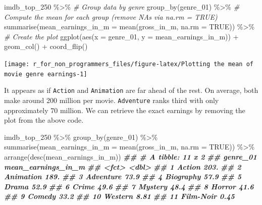\documentclass[
]{book}
\newenvironment{Shaded}{\begin{snugshade}}{\end{snugshade}}
\newcommand{\AttributeTok}[1]{\textcolor[rgb]{0.77,0.63,0.00}{#1}}
\newcommand{\CommentTok}[1]{\textcolor[rgb]{0.56,0.35,0.01}{\textit{#1}}}
\newcommand{\ConstantTok}[1]{\textcolor[rgb]{0.00,0.00,0.00}{#1}}
\newcommand{\DocumentationTok}[1]{\textcolor[rgb]{0.56,0.35,0.01}{\textbf{\textit{#1}}}}
\newcommand{\FunctionTok}[1]{\textcolor[rgb]{0.00,0.00,0.00}{#1}}
\newcommand{\NormalTok}[1]{#1}
\newcommand{\SpecialCharTok}[1]{\textcolor[rgb]{0.00,0.00,0.00}{#1}}
\begin{document}
\begin{Shaded}
\begin{Highlighting}[]
\NormalTok{imdb\_top\_250 }\SpecialCharTok{\%\textgreater{}\%} 
  \CommentTok{\# Group data by genre}
  \FunctionTok{group\_by}\NormalTok{(genre\_01) }\SpecialCharTok{\%\textgreater{}\%} 
  \CommentTok{\# Compute the mean for each group (remove NAs via na.rm = TRUE)}
  \FunctionTok{summarise}\NormalTok{(}\AttributeTok{mean\_earnings\_in\_m =} \FunctionTok{mean}\NormalTok{(gross\_in\_m, }\AttributeTok{na.rm =} \ConstantTok{TRUE}\NormalTok{)) }\SpecialCharTok{\%\textgreater{}\%} 
\CommentTok{\# Create the plot}
  \FunctionTok{ggplot}\NormalTok{(}\FunctionTok{aes}\NormalTok{(}\AttributeTok{x =}\NormalTok{ genre\_01, }\AttributeTok{y =}\NormalTok{ mean\_earnings\_in\_m)) }\SpecialCharTok{+}
  \FunctionTok{geom\_col}\NormalTok{() }\SpecialCharTok{+}
  \FunctionTok{coord\_flip}\NormalTok{()}
\end{Highlighting}
\end{Shaded}

\begin{center}\texttt{[image: r\_for\_non\_programmers\_files/figure-latex/Plotting the mean of movie genre earnings-1]} \end{center}

It appears as if \texttt{Action} and \texttt{Animation} are far ahead of the rest. On average, both make around 200 million per movie. \texttt{Adventure} ranks third with only approximately 70 million. We can retrieve the exact earnings by removing the plot from the above code.

\begin{Shaded}
\begin{Highlighting}[]
\NormalTok{imdb\_top\_250 }\SpecialCharTok{\%\textgreater{}\%} 
  \FunctionTok{group\_by}\NormalTok{(genre\_01) }\SpecialCharTok{\%\textgreater{}\%}
  \FunctionTok{summarise}\NormalTok{(}\AttributeTok{mean\_earnings\_in\_m =} \FunctionTok{mean}\NormalTok{(gross\_in\_m, }\AttributeTok{na.rm =} \ConstantTok{TRUE}\NormalTok{)) }\SpecialCharTok{\%\textgreater{}\%} 
  \FunctionTok{arrange}\NormalTok{(}\FunctionTok{desc}\NormalTok{(mean\_earnings\_in\_m))}
\DocumentationTok{\#\# \# A tibble: 11 x 2}
\DocumentationTok{\#\#    genre\_01  mean\_earnings\_in\_m}
\DocumentationTok{\#\#    \textless{}fct\textgreater{}                  \textless{}dbl\textgreater{}}
\DocumentationTok{\#\#  1 Action                203.  }
\DocumentationTok{\#\#  2 Animation             189.  }
\DocumentationTok{\#\#  3 Adventure              73.9 }
\DocumentationTok{\#\#  4 Biography              57.9 }
\DocumentationTok{\#\#  5 Drama                  52.9 }
\DocumentationTok{\#\#  6 Crime                  49.6 }
\DocumentationTok{\#\#  7 Mystery                48.4 }
\DocumentationTok{\#\#  8 Horror                 41.6 }
\DocumentationTok{\#\#  9 Comedy                 33.2 }
\DocumentationTok{\#\# 10 Western                 8.81}
\DocumentationTok{\#\# 11 Film{-}Noir               0.45}
\end{Highlighting}
\end{Shaded}
\end{document}

